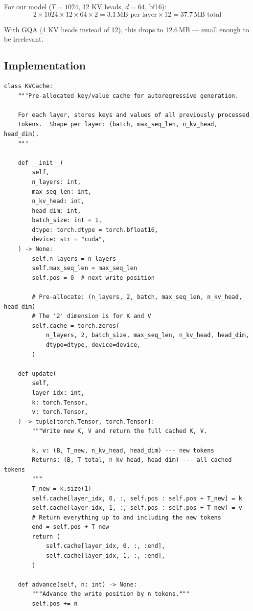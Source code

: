 For our model ($T{=}1024$, 12 KV heads, $d{=}64$, bf16):
\[
  2 \times 1024 \times 12 \times 64 \times 2 = 3.1\,\text{MB per layer} \times 12 = 37.7\,\text{MB total}
\]

With GQA (4 KV heads instead of 12), this drops to 12.6\,MB --- small enough to be irrelevant.

\subsection{Implementation}

\begin{lstlisting}
class KVCache:
    """Pre-allocated key/value cache for autoregressive generation.

    For each layer, stores keys and values of all previously processed
    tokens.  Shape per layer: (batch, max_seq_len, n_kv_head, head_dim).
    """

    def __init__(
        self,
        n_layers: int,
        max_seq_len: int,
        n_kv_head: int,
        head_dim: int,
        batch_size: int = 1,
        dtype: torch.dtype = torch.bfloat16,
        device: str = "cuda",
    ) -> None:
        self.n_layers = n_layers
        self.max_seq_len = max_seq_len
        self.pos = 0  # next write position

        # Pre-allocate: (n_layers, 2, batch, max_seq_len, n_kv_head, head_dim)
        # The '2' dimension is for K and V
        self.cache = torch.zeros(
            n_layers, 2, batch_size, max_seq_len, n_kv_head, head_dim,
            dtype=dtype, device=device,
        )

    def update(
        self,
        layer_idx: int,
        k: torch.Tensor,
        v: torch.Tensor,
    ) -> tuple[torch.Tensor, torch.Tensor]:
        """Write new K, V and return the full cached K, V.

        k, v: (B, T_new, n_kv_head, head_dim) --- new tokens
        Returns: (B, T_total, n_kv_head, head_dim) --- all cached tokens
        """
        T_new = k.size(1)
        self.cache[layer_idx, 0, :, self.pos : self.pos + T_new] = k
        self.cache[layer_idx, 1, :, self.pos : self.pos + T_new] = v
        # Return everything up to and including the new tokens
        end = self.pos + T_new
        return (
            self.cache[layer_idx, 0, :, :end],
            self.cache[layer_idx, 1, :, :end],
        )

    def advance(self, n: int) -> None:
        """Advance the write position by n tokens."""
        self.pos += n
\end{lstlisting}


